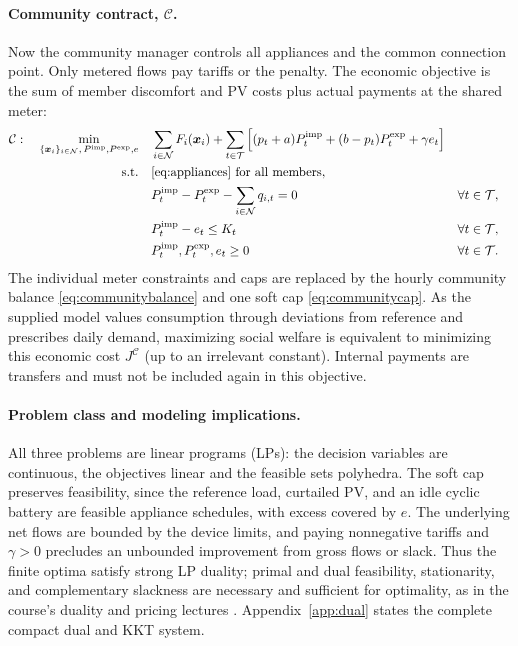 \documentclass[10pt,a4paper]{article}
\newcommand{\Cmod}{\mathcal C}
\begin{document}
\paragraph{Community contract, \(\Cmod\).} Now the community manager controls all appliances and the common connection point. Only metered flows pay tariffs or the penalty. The economic objective is the sum of member discomfort and PV costs plus actual payments at the shared meter:
\begin{subequations}\label{eq:C}
\begin{align}
\Cmod:\quad
\min_{\{\bm x_i\}_{i\in\mathcal N},\,P^{\rm imp},P^{\rm exp},e}\quad
 &\sum_{i\in\mathcal N}F_i(\bm x_i)
 +\sum_{t\in\mathcal T}\left[
 (p_t+a)P_t^{\rm imp}+(b-p_t)P_t^{\rm exp}+\gamma e_t\right]\\
\text{s.t.}\quad &\eqref{eq:appliances}\ \text{for all members},\nonumber\\
 &P_t^{\rm imp}-P_t^{\rm exp}-\sum_{i\in\mathcal N}q_{i,t}=0
        &&\forall t\in\mathcal T, \label{eq:communitybalance}\\
 &P_t^{\rm imp}-e_t\le K_t
        &&\forall t\in\mathcal T, \label{eq:communitycap}\\
 &P_t^{\rm imp},P_t^{\rm exp},e_t\ge0
        &&\forall t\in\mathcal T.
\end{align}
\end{subequations}
The individual meter constraints and caps are replaced by the hourly community balance \eqref{eq:communitybalance} and one soft cap \eqref{eq:communitycap}. As the supplied model values consumption through deviations from reference and prescribes daily demand, maximizing social welfare is equivalent to minimizing this economic cost $J^{\Cmod}$ (up to an irrelevant constant). Internal payments are transfers and must not be included again in this objective.

\paragraph{Problem class and modeling implications.}
All three problems are linear programs (LPs): the decision variables are continuous, the objectives linear and the feasible sets polyhedra. The soft cap preserves feasibility, since the reference load, curtailed PV, and an idle cyclic battery are feasible appliance schedules, with excess covered by $e$. The underlying net flows are bounded by the device limits, and paying nonnegative tariffs and $\gamma>0$ precludes an unbounded improvement from gross flows or slack. Thus the finite optima satisfy strong LP duality; primal and dual feasibility, stationarity, and complementary slackness are necessary and sufficient for optimality, as in the course's duality and pricing lectures \cite{slides,week4}. Appendix~\ref{app:dual} states the complete compact dual and KKT system.
\end{document}
